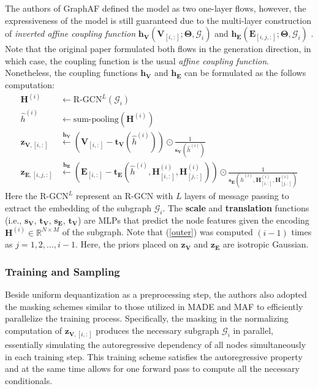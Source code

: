 The authors of GraphAF defined the model as two one-layer flows, however, the expressiveness of
the model is still guaranteed due to the multi-layer construction of
\textit{inverted affine coupling function} $\mathbf{h}_{\mathbf{V}}(\mathbf{V}_{[i,:]};
\mathbf{\Theta}, \mathcal{G}_{i})$ and
$\mathbf{h}_{\mathbf{E}}(\mathbf{E}_{[i,j,:]};
\mathbf{\Theta}, \mathcal{G}_{i})$ . Note that the original paper formulated
both flows in the generation direction, in which case, the coupling function is
the usual \textit{affine coupling function}. Nonetheless, the coupling functions
$\mathbf{h}_{\mathbf{V}}$ and $\mathbf{h}_{\mathbf{E}}$ can be formulated
as the follows computation:
\begin{align}
  \mathbf{H}^{(i)} &\longleftarrow \text{R-GCN}^L(\mathcal{G}_{i})\\
  \hat{h}^{(i)} &\longleftarrow \text{sum-pooling}(\mathbf{H}^{(i)})\\
  \mathbf{z}_{\mathbf{V}, [i,:]} &\overset{\mathbf{h}_{\mathbf{V}}}{\longleftarrow} (\mathbf{V}_{[i,:]} -
  \mathbf{t}_{\mathbf{V}}(\hat{h}^{(i)})) \odot
  \frac{1}{\mathbf{s}_{\mathbf{V}}(\hat{h}^{(i)})}\\
  \mathbf{z}_{\mathbf{E}, [i,j,:]} &\overset{\mathbf{h}_{\mathbf{E}}}{\longleftarrow} (\mathbf{E}_{[i,:]} -
  \mathbf{t}_{\mathbf{E}}(\hat{h}^{(i)}, \mathbf{H}^{(i)}_{[i,:]},
  \mathbf{H}^{(i)}_{[j,:]})) \odot
  \frac{1}{\mathbf{s}_{\mathbf{E}}(\hat{h}^{(i)}, \mathbf{H}^{(i)}_{[i,:]},
  \mathbf{H}^{(i)}_{[j,:]})} \label{outer}
\end{align}
Here the $\text{R-GCN}^L$ represent an R-GCN with $L$ layers of message passing
to extract the embedding of the subgraph $\mathcal{G}_{i}$. The \textbf{scale}
and \textbf{translation} functions (i.e., $\mathbf{s}_{\mathbf{V}}$,
$\mathbf{t}_{\mathbf{V}}$, $\mathbf{s}_{\mathbf{E}}$, $\mathbf{t}_{\mathbf{V}}$) are MLPs
that predict the node features given the encoding $\mathbf{H}^{(i)} \in
\mathbb{R}^{N \times M}$ of the
subgraph. Note that (\ref{outer}) was computed $(i-1)$ times as $j=1,2,\ldots,
i-1$. Here, the priors placed on $\mathbf{z}_{\mathbf{V}}$ and
$\mathbf{z}_{\mathbf{E}}$ are isotropic Gaussian.

\subsubsection{Training and Sampling}

Beside uniform dequantization as a preprocessing step, the authors also adopted
the masking schemes similar to those utilized in MADE \citep{germainMADEMaskedAutoencoder2015} and MAF
\citep{papamakariosMaskedAutoregressiveFlow2017} to efficiently parallelize the
training process. Specifically, the masking in the normalizing computation of
$\mathbf{z}_{\mathbf{V}, [i,:]}$ produces the necessary subgraph
$\mathcal{G}_{i}$ in parallel, essentially simulating the autoregressive
dependency of all nodes simultaneously in each training step. This training
scheme satisfies the autoregressive property and at the same time allows for one
forward pass to compute all the necessary conditionals.

